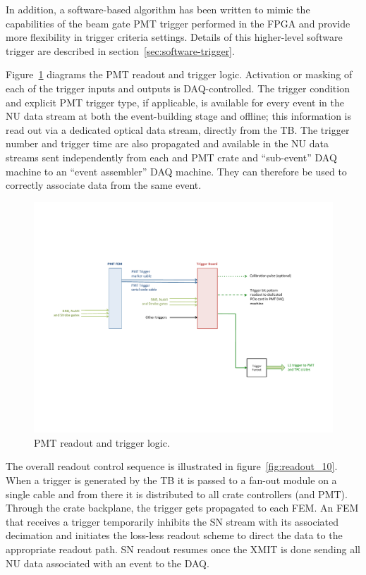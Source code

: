 In addition, a software-based algorithm has been written to mimic the capabilities of the beam gate PMT trigger performed in the FPGA and provide more flexibility in trigger criteria settings. Details of this higher-level software trigger are described in section~\ref{sec:software-trigger}.


Figure~\ref{fig:readout_9} diagrams the PMT readout and trigger logic. Activation or masking of each of the trigger inputs and outputs is DAQ-controlled. The trigger condition and explicit PMT trigger type, if applicable, is available for every event in the NU data stream at both the event-building stage and offline; this information is read out via a dedicated optical data stream, directly from the TB. The trigger number and trigger time are also propagated and available in the NU data streams sent independently from each \lartpc and PMT crate and ``sub-event'' DAQ machine to an ``event assembler'' DAQ machine. They can therefore be used to correctly associate data from the same event.

\begin{figure}
\centering
\includegraphics[width=0.8\linewidth]{./figures/readout_9.pdf}%
\caption{\label{fig:readout_9}PMT readout and trigger logic.}
\end{figure}

The overall readout control sequence is illustrated in figure~\ref{fig:readout_10}. When a trigger is generated by the TB it is passed to a fan-out module on a single cable and from there it is distributed to all crate controllers (\lartpc and PMT). Through the crate backplane, the trigger gets propagated to each FEM. An FEM that receives a trigger temporarily inhibits the SN stream with its associated decimation and initiates the loss-less readout scheme to direct the data to the appropriate readout path. SN readout resumes once the XMIT is done sending all NU data associated with an event to the DAQ. 

